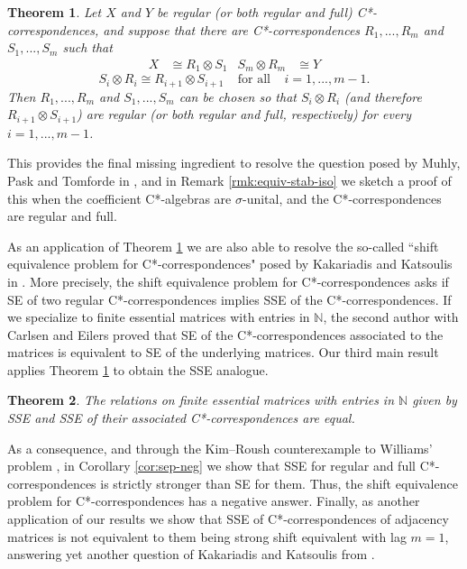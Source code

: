 \documentclass[11pt, letterpaper,final]{amsart}
\newtheorem{theoremintro}{Theorem}
\theoremstyle{definition}
\begin{document}
\begin{theoremintro} \label{thm:to-reg-or-full}
Let $X$ and $Y$ be regular (or both regular and full) C*-correspondences, and suppose that there are C*-correspondences $R_1,...,R_m$ and $S_1,...,S_m$ such that
\begin{align*}
X & \cong R_1\otimes S_1 & S_m \otimes R_m & \cong Y 
\end{align*} 
$$
S_i \otimes R_i \cong R_{i+1} \otimes S_{i+1} \ \ \ \ \ \text{for all} \ \ \ \ \  i=1,...,m-1.
$$
Then $R_1,...,R_m$ and $S_1,...,S_m$ can be chosen so that $S_i \otimes R_i$ (and therefore $R_{i+1} \otimes S_{i+1}$) are regular (or both regular and full, respectively) for every $i=1,...,m-1$.
\end{theoremintro}

This provides the final missing ingredient to resolve the question posed by Muhly, Pask and Tomforde in \cite[Remark 5.5]{MPT08}, and in Remark \ref{rmk:equiv-stab-iso} we sketch a proof of this when the coefficient C*-algebras are $\sigma$-unital, and the C*-correspondences are regular and full.

As an application of Theorem \ref{thm:to-reg-or-full} we are also able to resolve the so-called ``shift equivalence problem for C*-correspondences" posed by Kakariadis and Katsoulis in \cite[Section 6]{KK-JFA2014}. More precisely, the shift equivalence problem for C*-correspondences asks if SE of two regular C*-correspondences implies SSE of the C*-correspondences. If we specialize to finite essential matrices with entries in $\mathbb{N}$, the second author with Carlsen and Eilers \cite[Proposition 3.5]{CDE} proved that SE of the C*-correspondences associated to the matrices is equivalent to SE of the underlying matrices. Our third main result applies Theorem \ref{thm:to-reg-or-full} to obtain the SSE analogue.

\begin{theoremintro} \label{thm:msse=sse}
The relations on finite essential matrices with entries in $\mathbb{N}$ given by SSE and SSE of their associated C*-correspondences are equal.
 \end{theoremintro}

As a consequence, and through the Kim--Roush counterexample to Williams' problem \cite{KR99}, in Corollary \ref{cor:sep-neg} we show that SSE for regular and full C*-correspondences is strictly stronger than SE for them. Thus, the shift equivalence problem for C*-corresponden\-ces has a negative answer. Finally, as another application of our results we show that SSE of C*-correspondences of adjacency matrices is not equivalent to them being strong shift equivalent with lag $m=1$, answering yet another question of Kakariadis and Katsoulis from \cite{KK-JFA2014}.
\end{document}
